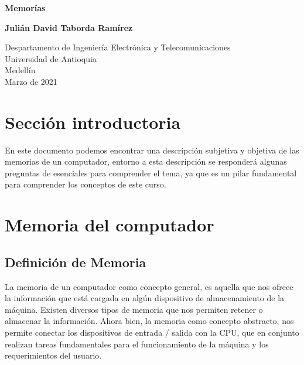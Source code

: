 \documentclass{article}
\begin{document}
\begin{titlepage}
    \begin{center}
        \vspace*{1cm}
            
        \Huge
        \textbf{Memorías}
            
        \vspace{0.5cm}
        \LARGE
            
        \vspace{1.5cm}
            
        \textbf{Julián David Taborda Ramírez}
            
        \vfill
            
        \vspace{0.8cm}
            
        \Large
        Despartamento de Ingeniería Electrónica y Telecomunicaciones\\
        Universidad de Antioquia\\
        Medellín\\
        Marzo de 2021
            
    \end{center}
\end{titlepage}

\tableofcontents
\newpage
\section{Sección introductoria}\label{intro}
En este documento podemos encontrar una descripción subjetiva y objetiva de las memorias de un computador, entorno a esta descripción se responderá algunas preguntas de esenciales para comprender el tema, ya que es un pilar fundamental para comprender los conceptos de este curso\cite{Augusto}. 
\section{Memoria del computador} \label{contenido}
\subsection{Definición de Memoria}

La memoria de un computador como concepto general, es aquella que nos ofrece la información que está cargada en algún dispositivo de almacenamiento de la máquina. Existen diversos tipos de memoria que nos permiten retener o almacenar la información. Ahora bien, la memoria como concepto abstracto, nos permite conectar los dispositivos de entrada / salida con la CPU, que en conjunto realizan tareas fundamentales para el funcionamiento de la máquina y los requerimientos del usuario. 
\end{document}
